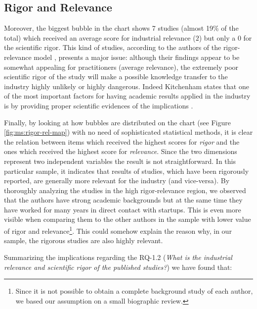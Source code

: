 \documentclass[final,5p,times,twocolumn]{elsarticle}
\begin{document}
\subsection{Rigor and Relevance}

Moreover, the biggest bubble in the chart shows 7 studies (almost 19\% of the total) which received an average score for industrial relevance ($2$) but only a $0$ for the scientific rigor. This kind of studies, according to the authors of the rigor-relevance model \cite{Ivarsson2010}, presents a major issue: although their findings appear to be somewhat appealing for practitioners (average relevance), the extremely poor scientific rigor of the study will make a possible knowledge transfer to the industry highly unlikely or highly dangerous. Indeed Kitchenham states that one of the most important factors for having academic results applied in the industry is by providing proper scientific evidences of the implications \cite{Kitchenham2005,Kitchenham2004}.

Finally, by looking at how bubbles are distributed on the chart (see Figure \ref{fig:ms:rigor-rel-map}) with no need of sophisticated statistical methods, it is clear the relation between items which received the highest scores for \textit{rigor} and the ones which received the highest score for \textit{relevance}. Since the two dimensions represent two independent variables the result is not straightforward. In this particular sample, it indicates that results of studies, which have been rigorously reported, are generally more relevant for the industry (and vice-versa). By thoroughly analyzing the studies in the high rigor-relevance region, we observed that the authors have strong academic backgrounds but at the same time they have worked for many years in direct contact with startups. This is even more visible when comparing them to the other authors in the sample with lower value of rigor and relevance\footnote{Since it is not possible to obtain a complete background study of each author, we based our assumption on a small biographic review.}. This could somehow explain the reason why, in our sample, the rigorous studies are also highly relevant.

Summarizing the implications regarding the RQ-1.2 (\textit{What is the industrial relevance and scientific rigor of the published studies?}) we have found that:
\end{document}
